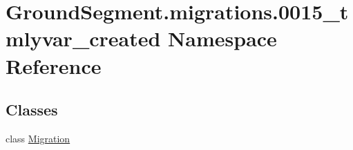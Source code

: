 \hypertarget{namespace_ground_segment_1_1migrations_1_10015__tmlyvar__created}{}\section{Ground\+Segment.\+migrations.0015\+\_\+tmlyvar\+\_\+created Namespace Reference}
\label{namespace_ground_segment_1_1migrations_1_10015__tmlyvar__created}
\subsection*{Classes}
\begin{DoxyCompactItemize}
\item 
class \hyperlink{class_ground_segment_1_1migrations_1_10015__tmlyvar__created_1_1_migration}{Migration}
\end{DoxyCompactItemize}
